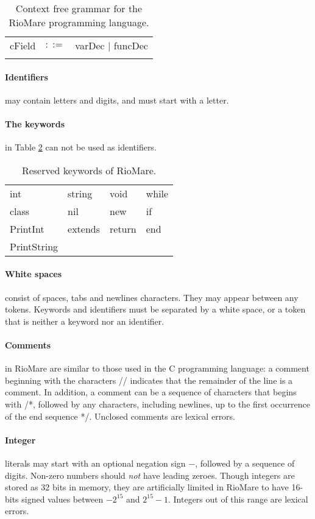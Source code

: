 \documentclass{article}
\begin{document}
\begin{table}[h]
\begin{tabular}{ l c l }
  cField      & $::=$ & varDec $|$ funcDec                                             \\ \\
\end{tabular}
\caption{
Context free grammar for the RioMare programming language.
\label{Table_CFG_Of_RioMare}}
\end{table}

\paragraph{Identifiers} may contain letters and digits, and must start with a letter.
\paragraph{The keywords} in Table \ref{Table_Reserved_Keywords_of_RioMare} can not
be used as identifiers.
\begin{table}[h]
\centering
\begin{tabular}{ l l l l}
  int         & string  & void   & while \\
  class       & nil     & new    & if    \\
  PrintInt    & extends & return & end   \\
  PrintString &         &        &       \\
\end{tabular}
\caption{
Reserved keywords of RioMare.
\label{Table_Reserved_Keywords_of_RioMare}}
\end{table}
\paragraph{White spaces} consist of spaces, tabs and newlines
characters. They may appear between any tokens.
Keywords and identifiers must be separated by a white space,
or a token that is neither a keyword nor an identifier.
\paragraph{Comments} in RioMare are similar to those used in the C programming language:
a comment beginning with the characters // indicates that the remainder of the line is a comment.
In addition, a comment can be a sequence of characters that begins with /*,
followed by any characters, including newlines, up to the first occurrence of the end sequence */. Unclosed comments are lexical errors.
\paragraph{Integer} literals may start with an optional negation sign $-$,
followed by a sequence of digits.
Non-zero numbers should \textit{not} have leading zeroes.
Though integers are stored as 32 bits in memory,
they are artificially limited in RioMare to have
16-bits signed values between $-2^{15}$ and $2^{15}-1$.
Integers out of this range are lexical errors.
\end{document}
